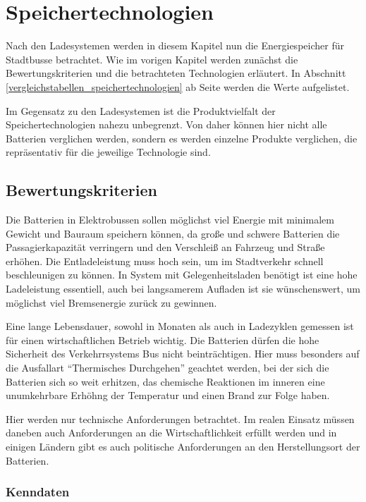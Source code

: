 \chapter{Speichertechnologien}

Nach den Ladesystemen werden in diesem Kapitel nun die Energiespeicher für Stadtbusse betrachtet. Wie im vorigen Kapitel werden zunächst die Bewertungskriterien und die betrachteten Technologien erläutert. In Abschnitt \ref{vergleichstabellen_speichertechnologien} ab Seite \pageref{vergleichstabellen_speichertechnologien} werden die Werte aufgelistet.

Im Gegensatz zu den Ladesystemen ist die Produktvielfalt der Speichertechnologien nahezu unbegrenzt. Von daher können hier nicht alle Batterien verglichen werden, sondern es werden einzelne Produkte verglichen, die repräsentativ für die jeweilige Technologie sind.

\section{Bewertungskriterien}
Die Batterien in Elektrobussen sollen möglichst viel Energie mit minimalem Gewicht und Bauraum speichern können, da große und schwere Batterien die Passagierkapazität verringern und den Verschleiß an Fahrzeug und Straße erhöhen. Die Entladeleistung muss hoch sein, um im Stadtverkehr schnell beschleunigen zu können. In System mit Gelegenheitsladen benötigt ist eine hohe Ladeleistung essentiell, auch bei langsamerem Aufladen ist sie wünschenswert, um möglichst viel Bremsenergie zurück zu gewinnen.

Eine lange Lebensdauer, sowohl in Monaten als auch in Ladezyklen gemessen ist für einen wirtschaftlichen Betrieb wichtig. Die Batterien dürfen die hohe Sicherheit des Verkehrrsystems Bus nicht beinträchtigen. Hier muss besonders auf die Ausfallart "`Thermisches Durchgehen"' geachtet werden, bei der sich die Batterien sich so weit erhitzen, das chemische Reaktionen im inneren eine unumkehrbare Erhöhng der Temperatur und einen Brand zur Folge haben.

Hier werden nur technische Anforderungen betrachtet. Im realen Einsatz müssen daneben auch Anforderungen an die Wirtschaftlichkeit erfüllt werden und in einigen Ländern gibt es auch politische Anforderungen an den Herstellungsort der Batterien.

\subsection{Kenndaten}

